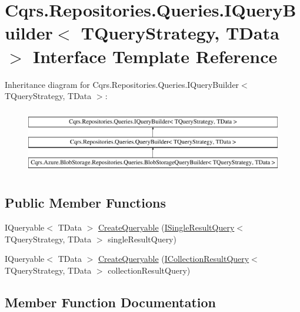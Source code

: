\hypertarget{interfaceCqrs_1_1Repositories_1_1Queries_1_1IQueryBuilder}{}\section{Cqrs.\+Repositories.\+Queries.\+I\+Query\+Builder$<$ T\+Query\+Strategy, T\+Data $>$ Interface Template Reference}
\label{interfaceCqrs_1_1Repositories_1_1Queries_1_1IQueryBuilder}
Inheritance diagram for Cqrs.\+Repositories.\+Queries.\+I\+Query\+Builder$<$ T\+Query\+Strategy, T\+Data $>$\+:\begin{figure}[H]
\begin{center}
\leavevmode
\includegraphics[height=2.876712cm]{interfaceCqrs_1_1Repositories_1_1Queries_1_1IQueryBuilder}
\end{center}
\end{figure}
\subsection*{Public Member Functions}
\begin{DoxyCompactItemize}
\item 
I\+Queryable$<$ T\+Data $>$ \hyperlink{interfaceCqrs_1_1Repositories_1_1Queries_1_1IQueryBuilder_a83cb87d485491c6d38fe8fa6fd649373}{Create\+Queryable} (\hyperlink{interfaceCqrs_1_1Repositories_1_1Queries_1_1ISingleResultQuery}{I\+Single\+Result\+Query}$<$ T\+Query\+Strategy, T\+Data $>$ single\+Result\+Query)
\item 
I\+Queryable$<$ T\+Data $>$ \hyperlink{interfaceCqrs_1_1Repositories_1_1Queries_1_1IQueryBuilder_ab903955b6fb1843a3e168b33252161a5}{Create\+Queryable} (\hyperlink{interfaceCqrs_1_1Repositories_1_1Queries_1_1ICollectionResultQuery}{I\+Collection\+Result\+Query}$<$ T\+Query\+Strategy, T\+Data $>$ collection\+Result\+Query)
\end{DoxyCompactItemize}


\subsection{Member Function Documentation}
\mbox{\label{interfaceCqrs_1_1Repositories_1_1Queries_1_1IQueryBuilder_a83cb87d485491c6d38fe8fa6fd649373}} 

